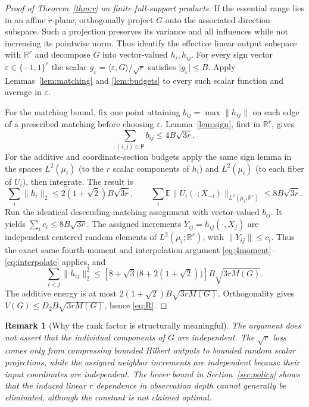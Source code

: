 \documentclass[11pt,letterpaper]{article}
\newtheorem{remark}[theorem]{Remark}
\theoremstyle{definition}
\newcommand{\E}{\mathbb E}
\newcommand{\abs}[1]{\lvert #1\rvert}
\newcommand{\norm}[1]{\lVert #1\rVert}
\begin{document}
\begin{proof}[Proof of Theorem~\ref{thm:r} on finite full-support products]
If the essential range lies in an affine $r$-plane, orthogonally project $G$ onto the associated direction subspace. Such a projection preserves its variance and all influences while not increasing its pointwise norm. Thus identify the effective linear output subspace with $\mathbb R^r$ and decompose $G$ into vector-valued $h_i,h_{ij}$. For every sign vector $\varepsilon\in\{-1,1\}^r$ the scalar $g_\varepsilon=\langle\varepsilon,G\rangle/\sqrt r$ satisfies $\abs{g_\varepsilon}\le B$. Apply Lemmas~\ref{lem:matching} and \ref{lem:budgets} to every such scalar function and average in $\varepsilon$.

For the matching bound, fix one point attaining $b_{ij}=\max\norm{h_{ij}}$ on each edge of a prescribed matching before choosing $\varepsilon$. Lemma~\ref{lem:sign}, first in $\mathbb R^r$, gives
\begin{equation}\label{eq:vectorbudgets}
\sum_{(i,j)\in\mathsf P}b_{ij}\le4B\sqrt{3r}.
\end{equation}
For the additive and coordinate-section budgets apply the same sign lemma in the spaces $L^2(\mu_i)$ (to the $r$ scalar components of $h_i$) and $L^2(\mu_i)$ (to each fiber of $U_i$), then integrate. The result is
\begin{equation}\label{eq:vectorbudget2}
\sum_i\norm{h_i}_2\le2(1+\sqrt2)B\sqrt{3r},\qquad
\sum_i\E\norm{U_i(\cdot;X_{-i})}_{L^2(\mu_i;\mathbb R^r)}\le8B\sqrt{3r}.
\end{equation}
Run the identical descending-matching assignment with vector-valued $b_{ij}$. It yields $\sum_i c_i\le8B\sqrt{3r}$. The assigned increments $Y_{ij}=h_{ij}(\cdot,X_j)$ are independent centered random elements of $L^2(\mu_i;\mathbb R^r)$, with $\norm{Y_{ij}}\le c_i$. Thus the exact same fourth-moment and interpolation argument \eqref{eq:4moment}--\eqref{eq:interpolate} applies, and
\[
\sum_{i<j}\norm{h_{ij}}_2^2\le
\left[8+\sqrt3\bigl(8+2(1+\sqrt2)\bigr)\right]B\sqrt{3rM(G)}.
\]
The additive energy is at most $2(1+\sqrt2)B\sqrt{3rM(G)}$. Orthogonality gives $V(G)\le D_2 B\sqrt{3rM(G)}$, hence \eqref{eq:R}.
\end{proof}

\begin{remark}[Why the rank factor is structurally meaningful]
The argument does not assert that the individual components of $G$ are independent. The $\sqrt r$ loss comes only from compressing bounded Hilbert outputs to bounded random scalar projections, while the assigned neighbor increments are independent because their \emph{input coordinates} are independent. The lower bound in Section~\ref{sec:policy} shows that the induced linear $r$ dependence in observation depth cannot generally be eliminated, although the constant is not claimed optimal.
\end{remark}
\end{document}
